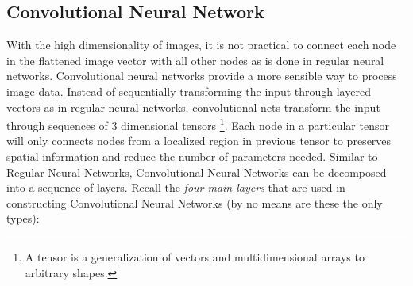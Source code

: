 \documentclass[11pt]{article}
\begin{document}
\subsection{Convolutional Neural Network}
With the high dimensionality of images, it is not practical to connect each node in the flattened image vector with all other nodes as is done in regular neural networks. Convolutional neural networks provide a more sensible way to process image data. Instead of sequentially transforming the input through layered vectors as in regular neural networks, convolutional nets transform the input through sequences of 3 dimensional tensors \footnote{A tensor is a generalization of vectors and multidimensional arrays to arbitrary shapes. }. Each node in a particular tensor will only connects nodes from a localized region in previous tensor to preserves spatial information and reduce the number of parameters needed. Similar to Regular Neural Networks, Convolutional Neural Networks can be decomposed into a sequence of layers. Recall the \textit{four main layers} that are used in constructing Convolutional Neural Networks (by no means are these the only types):
\end{document}
